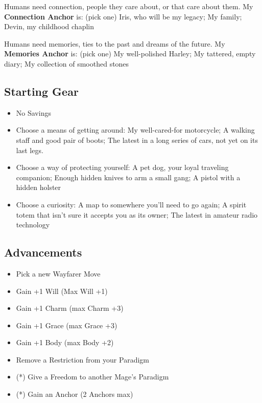 \documentclass[10pt,twoside,openright]{memoir}
\begin{document}
Humans need connection, people they care about, or that care about them.
My \textbf{Connection Anchor} is: (pick one) Iris, who will be my
legacy; My family; Devin, my childhood chaplin

Humans need memories, ties to the past and dreams of the future. My
\textbf{Memories Anchor} is: (pick one) My well-polished Harley; My
tattered, empty diary; My collection of smoothed stones

\hypertarget{starting-gear-8}{%
\subsection{Starting Gear}\label{starting-gear-8}}

\begin{itemize}
\tightlist
\item
  No Savings
\item
  Choose a means of getting around: My well-cared-for motorcycle; A
  walking staff and good pair of boots; The latest in a long series of
  cars, not yet on its last legs.
\item
  Choose a way of protecting yourself: A pet dog, your loyal traveling
  companion; Enough hidden knives to arm a small gang; A pistol with a
  hidden holster
\item
  Choose a curiosity: A map to somewhere you'll need to go again; A
  spirit totem that isn't sure it accepts you as its owner; The latest
  in amateur radio technology
\end{itemize}

\hypertarget{advancements-8}{%
\subsection{Advancements}\label{advancements-8}}

\begin{itemize}
\tightlist
\item
  Pick a new Wayfarer Move
\item
  Gain +1 Will (Max Will +1)
\item
  Gain +1 Charm (max Charm +3)
\item
  Gain +1 Grace (max Grace +3)
\item
  Gain +1 Body (max Body +2)
\item
  Remove a Restriction from your Paradigm
\item
  (*) Give a Freedom to another Mage's Paradigm
\item
  (*) Gain an Anchor (2 Anchors max)
\end{itemize}
\end{document}
